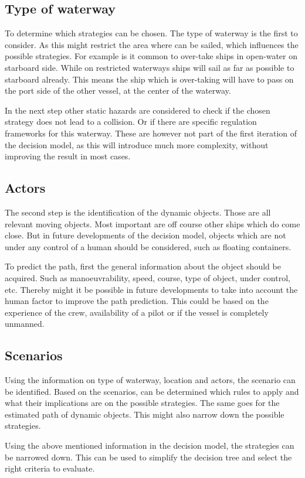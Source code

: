 \subsection{Type of waterway}
To determine which strategies can be chosen. The type of waterway is the first to consider. As this might restrict the area where can be sailed, which influences the possible strategies. For example is it common to over-take ships in open-water on starboard side. While on restricted waterways ships will sail as far as possible to starboard already. This means the ship which is over-taking will have to pass on the port side of the other vessel, at the center of the waterway.

In the next step other static hazards are considered to check if the chosen strategy does not lead to a collision. Or if there are specific regulation frameworks for this waterway. These are however not part of the first iteration of the decision model, as this will introduce much more complexity, without improving the result in most cases.


\subsection{Actors}
The second step is the identification of the dynamic objects. Those are all relevant moving objects. Most important are off course other ships which do come close. But in future developments of the decision model, objects which are not under any control of a human should be considered, such as floating containers.

To predict the path, first the general information about the object should be acquired. Such as manoeuvrability, speed, course, type of object, under control, etc.
Thereby might it be possible in future developments to take into account the human factor to improve the path prediction. This could be based on the experience of the crew, availability of a pilot or if the vessel is completely unmanned.

\subsection{Scenarios}
Using the information on type of waterway, location and actors, the scenario can be identified. Based on the scenarios, can be determined which rules to apply and what their implications are on the possible strategies. 
The same goes for the estimated path of dynamic objects. This might also narrow down the possible strategies.

Using the above mentioned information in the decision model, the strategies can be narrowed down. This can be used to simplify the decision tree and select the right criteria to evaluate.

